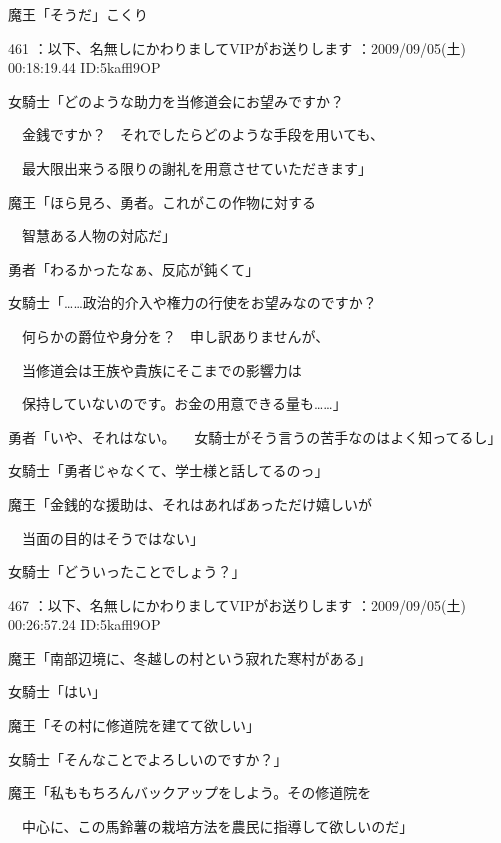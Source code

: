 \documentclass[a4j,twocolumn]{tarticle}
\begin{document}
魔王「そうだ」こくり 

	

	

461 ：以下、名無しにかわりましてVIPがお送りします ：2009/09/05(土) 00:18:19.44 ID:5kaffl9OP 


女騎士「どのような助力を当修道会にお望みですか？\par{} 
　金銭ですか？　それでしたらどのような手段を用いても、\par{} 
　最大限出来うる限りの謝礼を用意させていただきます」 



魔王「ほら見ろ、勇者。これがこの作物に対する\par{} 
　智慧ある人物の対応だ」 



勇者「わるかったなぁ、反応が鈍くて」 



女騎士「……政治的介入や権力の行使をお望みなのですか？\par{} 
　何らかの爵位や身分を？　申し訳ありませんが、\par{} 
　当修道会は王族や貴族にそこまでの影響力は\par{} 
　保持していないのです。お金の用意できる量も……」 



勇者「いや、それはない。 
　女騎士がそう言うの苦手なのはよく知ってるし」 



女騎士「勇者じゃなくて、学士様と話してるのっ」 



魔王「金銭的な援助は、それはあればあっただけ嬉しいが\par{} 
　当面の目的はそうではない」 



女騎士「どういったことでしょう？」 

	
    
    

467 ：以下、名無しにかわりましてVIPがお送りします ：2009/09/05(土) 00:26:57.24 ID:5kaffl9OP 


魔王「南部辺境に、冬越しの村という寂れた寒村がある」\par{} 
女騎士「はい」 



魔王「その村に修道院を建てて欲しい」\par{} 
女騎士「そんなことでよろしいのですか？」 



魔王「私ももちろんバックアップをしよう。その修道院を\par{} 
　中心に、この馬鈴薯の栽培方法を農民に指導して欲しいのだ」 
\end{document}

